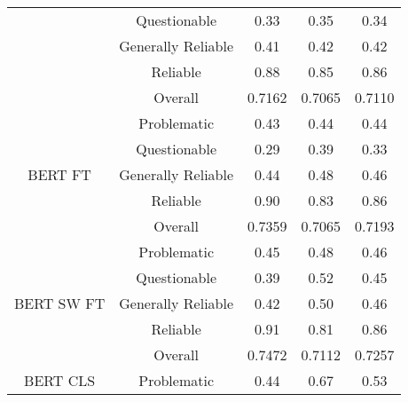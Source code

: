 \begin{table}[htbp]
\begin{tabular}{| c | c | c | c | c |}
                                                          & Questionable       & 0.33               & 0.35            & 0.34            \\
                                                          & Generally Reliable & 0.41               & 0.42            & 0.42            \\
                                                          & Reliable           & 0.88               & 0.85            & 0.86            \\\cline{2-5}
                                                          & Overall            & 0.7162             & 0.7065          & 0.7110          \\
        \hline
        \multirow{5}{*}{BERT FT}                          & Problematic        & 0.43               & 0.44            & 0.44            \\
                                                          & Questionable       & 0.29               & 0.39            & 0.33            \\
                                                          & Generally Reliable & 0.44               & 0.48            & 0.46            \\
                                                          & Reliable           & 0.90               & 0.83            & 0.86            \\\cline{2-5}
                                                          & Overall            & 0.7359             & 0.7065          & 0.7193          \\
        \hline
        \multirow{5}{*}{BERT SW FT}                       & Problematic        & 0.45               & 0.48            & 0.46            \\
                                                          & Questionable       & 0.39               & 0.52            & 0.45            \\
                                                          & Generally Reliable & 0.42               & 0.50            & 0.46            \\
                                                          & Reliable           & 0.91               & 0.81            & 0.86            \\\cline{2-5}
                                                          & Overall            & 0.7472             & 0.7112          & 0.7257          \\
        \hline
        \multirow{5}{*}{BERT CLS}                         & Problematic        & 0.44               & 0.67            & 0.53            \\

\end{tabular}
\end{table}
